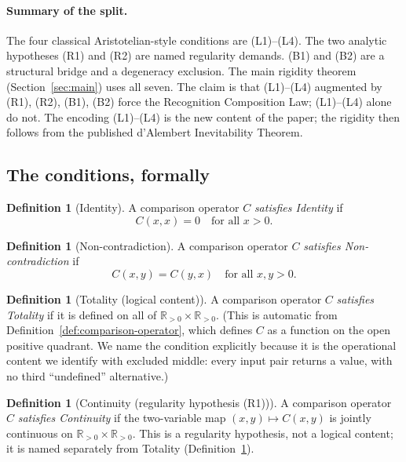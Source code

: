 \documentclass[11pt,a4paper]{article}
\theoremstyle{definition}
\newtheorem{definition}[theorem]{Definition}
\theoremstyle{remark}
\begin{document}
\paragraph{Summary of the split.} The four classical Aristotelian-style
conditions are (L1)--(L4). The two analytic hypotheses (R1) and (R2)
are named regularity demands. (B1) and (B2) are a structural bridge
and a degeneracy exclusion. The main rigidity theorem
(Section~\ref{sec:main}) uses all seven. The claim is that (L1)--(L4)
augmented by (R1), (R2), (B1), (B2) force the Recognition Composition
Law; (L1)--(L4) alone do not. The encoding (L1)--(L4) is the new
content of the paper; the rigidity then follows from the published
d'Alembert Inevitability Theorem.

\subsection{The conditions, formally}

\begin{definition}[Identity]
\label{def:identity}
A comparison operator $C$ \emph{satisfies Identity} if
\[
C(x, x) = 0 \quad \text{for all } x > 0.
\]
\end{definition}

\begin{definition}[Non-contradiction]
\label{def:noncontradiction}
A comparison operator $C$ \emph{satisfies Non-contradiction} if
\[
C(x, y) = C(y, x) \quad \text{for all } x, y > 0.
\]
\end{definition}

\begin{definition}[Totality (logical content)]
\label{def:totality}
A comparison operator $C$ \emph{satisfies Totality} if it is defined on
all of $\mathbb{R}_{>0} \times \mathbb{R}_{>0}$. (This is automatic from
Definition~\ref{def:comparison-operator}, which defines $C$ as a
function on the open positive quadrant. We name the condition explicitly
because it is the operational content we identify with excluded middle:
every input pair returns a value, with no third ``undefined'' alternative.)
\end{definition}

\begin{definition}[Continuity (regularity hypothesis (R1))]
\label{def:continuity}
A comparison operator $C$ \emph{satisfies Continuity} if the two-variable
map $(x, y) \longmapsto C(x, y)$ is jointly continuous on
$\mathbb{R}_{>0} \times \mathbb{R}_{>0}$. This is a regularity hypothesis,
not a logical content; it is named separately from Totality
(Definition~\ref{def:totality}).
\end{definition}
\end{document}
